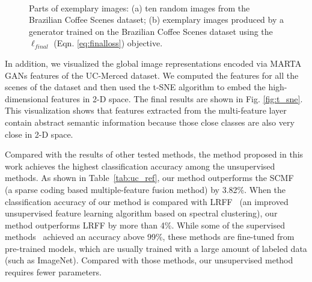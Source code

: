 \documentclass[journal]{IEEEtran}
\begin{document}
\begin{figure*} 
	\centering
	\hfill
	\\
	\caption{Parts of exemplary images: (a) ten random images from the Brazilian Coffee Scenes dataset; (b) exemplary images produced by a generator trained on the Brazilian Coffee Scenes dataset using the $\ell _{final}$ (Eqn. \ref{eq:finalloss}) objective.}
	\label{coffee}
		\vspace{-2mm} 
\end{figure*}

In addition, we visualized the global image representations encoded via MARTA GANs features of the UC-Merced dataset. We computed the features for all the scenes of the dataset and then used the t-SNE algorithm to embed the high-dimensional features in 2-D space. The final results are shown in Fig. \ref{fig:t_sne}. This visualization shows that features extracted from the multi-feature layer contain abstract semantic information because those close classes are also very close in 2-D space.





Compared with the results of other tested methods, the method proposed in this work achieves the highest classification accuracy among the unsupervised methods. As shown in Table~\ref{tab:uc_ref}, our method outperforms the SCMF~\cite{sheng2012high} (a sparse coding based multiple-feature fusion method) by 3.82\%. When the classification accuracy of our method is compared with  LRFF~\cite{hu2015unsupervised} (an improved unsupervised feature learning algorithm based on spectral clustering), our method  outperforms LRFF by more than 4\%. While some of the supervised methods~\cite{penatti2015deep, nogueira2017towards} achieved an accuracy above 99\%, these methods are fine-tuned from pre-trained models, which are usually trained with a large amount of labeled data (such as ImageNet). Compared with those methods, our unsupervised method requires fewer parameters.

\end{document}
